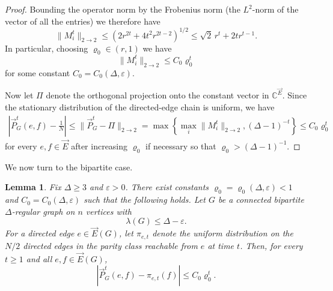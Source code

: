 \documentclass[11pt,a4paper]{article}
\theoremstyle{plain}
\newtheorem{lemma}[theorem]{Lemma}
\let\rho=\varrho
\let\epsilon=\varepsilon
\begin{document}
\begin{proof}
Bounding the operator norm by the Frobenius norm (the $L^2$-norm of the vector of all the entries) we therefore have
\[
\|M_i^t\|_{2\to2}
\le
\left(2r^{2t}+4t^2r^{2t-2}\right)^{1/2}
\le
\sqrt2\,r^t+2t r^{t-1}.
\]
In particular, choosing \(\rho_0\in (r,1)\) we have 
\[
\|M_i^t\|_{2\to2}
\le C_0\rho_0^t
\]
for some constant \(C_0=C_0(\Delta,\epsilon)\).



Now let \(\Pi\) denote the orthogonal projection onto the constant vector in
\(\mathbb C^{\vec E}\).
Since the stationary distribution of the directed-edge chain is uniform, we have
\begin{align}\label{eq:P-mix-bound}
\left|\vec P_G^t(e,f)-\frac1N\right|\leq\|\vec{P}_G^t-\Pi\|_{2\to2}
=
\max\left\{
\max_i\|M_i^t\|_{2\to2},
(\Delta-1)^{-t}
\right\}
\le
C_0\rho_0^t
\end{align}
for every \(e,f\in\vec E\)
after increasing
\(\rho_0\) if necessary so that \(\rho_0>(\Delta-1)^{-1}\).
\end{proof}

We now turn to the bipartite case. 

\begin{lemma}\label{lem-LP-mix-bipartite}
Fix $\Delta\ge3$ and $\varepsilon>0$. There exist constants
$
\rho_0=\rho_0(\Delta,\varepsilon)<1
$ 
and
$
C_0=C_0(\Delta,\varepsilon)
$
such that the following holds. Let $G$ be a connected bipartite
$\Delta$-regular graph on $n$ vertices with
\[
\lambda(G)
\le
\Delta-\varepsilon.
\]
For a directed edge $e\in\vec E(G)$, let $\pi_{e,t}$ denote the uniform distribution on the
$N/2$ directed edges in the parity class reachable from $e$ at
time $t$. Then, for every $t\ge1$ and all
$e,f\in\vec E(G)$,
\[
\left|
\vec P_G^t(e,f)-\pi_{e,t}(f)
\right|
\le
C_0\rho_0^t.
\]
\end{lemma}
\end{document}
